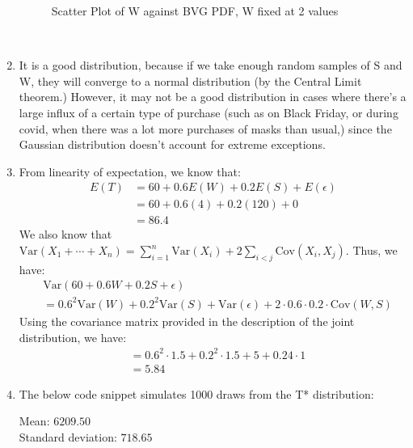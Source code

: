 \documentclass{harvardml}
\theoremstyle{definition}
\theoremstyle{plain}
\newcommand{\var}{\text{Var}}
\newcommand{\cov}{\text{Cov}}
\begin{document}
\begin{enumerate}
\begin{figure}[h]
        \caption{Scatter Plot of W against BVG PDF, W fixed at 2 values}
        \label{fig:q-3-2}
    \end{figure}\\

\item
    It is a good distribution, because if we take enough random samples of S and W, they will converge to a normal distribution (by the Central Limit theorem.) However, it may not be a good distribution in cases where there's a large influx of a certain type of purchase (such as on Black Friday, or during covid, when there was a lot more purchases of masks than usual,) since the Gaussian distribution doesn't account for extreme exceptions.

\item
    From linearity of expectation, we know that:
    \begin{align*}
        E(T)    &= 60 + 0.6E(W) + 0.2E(S) + E(\epsilon)\\
                &= 60 + 0.6(4) + 0.2(120) + 0\\
                &= 86.4
    \end{align*}
    We also know that $\var(X_1 + \cdots + X_n) = \sum_{i=1}^{n} \var(X_i) + 2\sum_{i<j} \cov(X_i, X_j)$. Thus, we have:
    \begin{align*}
        &\var(60 + 0.6W + 0.2S + \epsilon)\\
        &= 0.6^2\var(W) + 0.2^2\var(S) + \var(\epsilon) + 2\cdot0.6\cdot0.2\cdot\cov(W,S)
    \end{align*}
    Using the covariance matrix provided in the description of the joint distribution, we have:
    \begin{align*}
        &= 0.6^2\cdot1.5 + 0.2^2\cdot1.5 + 5 + 0.24\cdot1\\
        &= 5.84
    \end{align*}

\item
    The below code snippet simulates 1000 draws from the T* distribution:
    
    Mean: $6209.50$\\
    Standard deviation: $718.65$
\end{enumerate}
\end{document}
